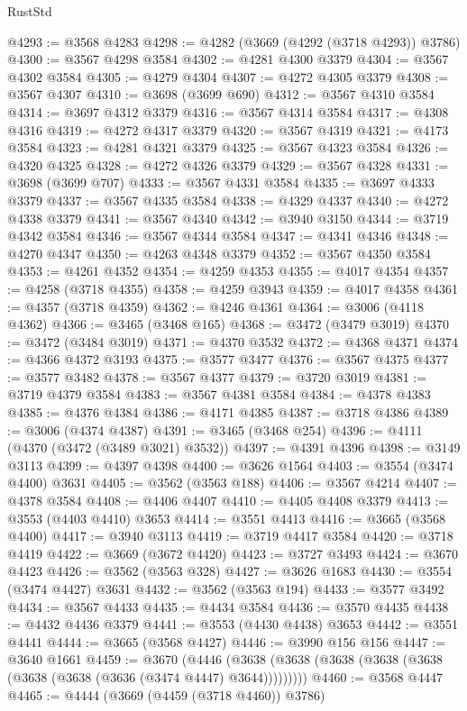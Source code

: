 \begin{lexlean}{RustStd}
\begin{coremodule}
@4293 := @3568 @4283
@4298 := @4282 (@3669 (@4292 (@3718 @4293)) @3786)
@4300 := @3567 @4298 @3584
@4302 := @4281 @4300 @3379
@4304 := @3567 @4302 @3584
@4305 := @4279 @4304
@4307 := @4272 @4305 @3379
@4308 := @3567 @4307
@4310 := @3698 (@3699 @690)
@4312 := @3567 @4310 @3584
@4314 := @3697 @4312 @3379
@4316 := @3567 @4314 @3584
@4317 := @4308 @4316
@4319 := @4272 @4317 @3379
@4320 := @3567 @4319
@4321 := @4173 @3584
@4323 := @4281 @4321 @3379
@4325 := @3567 @4323 @3584
@4326 := @4320 @4325
@4328 := @4272 @4326 @3379
@4329 := @3567 @4328
@4331 := @3698 (@3699 @707)
@4333 := @3567 @4331 @3584
@4335 := @3697 @4333 @3379
@4337 := @3567 @4335 @3584
@4338 := @4329 @4337
@4340 := @4272 @4338 @3379
@4341 := @3567 @4340
@4342 := @3940 @3150
@4344 := @3719 @4342 @3584
@4346 := @3567 @4344 @3584
@4347 := @4341 @4346
@4348 := @4270 @4347
@4350 := @4263 @4348 @3379
@4352 := @3567 @4350 @3584
@4353 := @4261 @4352
@4354 := @4259 @4353
@4355 := @4017 @4354
@4357 := @4258 (@3718 @4355)
@4358 := @4259 @3943
@4359 := @4017 @4358
@4361 := @4357 (@3718 @4359)
@4362 := @4246 @4361
@4364 := @3006 (@4118 @4362)
@4366 := @3465 (@3468 @165)
@4368 := @3472 (@3479 @3019)
@4370 := @3472 (@3484 @3019)
@4371 := @4370 @3532
@4372 := @4368 @4371
@4374 := @4366 @4372 @3193
@4375 := @3577 @3477
@4376 := @3567 @4375
@4377 := @3577 @3482
@4378 := @3567 @4377
@4379 := @3720 @3019
@4381 := @3719 @4379 @3584
@4383 := @3567 @4381 @3584
@4384 := @4378 @4383
@4385 := @4376 @4384
@4386 := @4171 @4385
@4387 := @3718 @4386
@4389 := @3006 (@4374 @4387)
@4391 := @3465 (@3468 @254)
@4396 := @4111 (@4370 (@3472 (@3489 @3021) @3532))
@4397 := @4391 @4396
@4398 := @3149 @3113
@4399 := @4397 @4398
@4400 := @3626 @1564
@4403 := @3554 (@3474 @4400) @3631
@4405 := @3562 (@3563 @188)
@4406 := @3567 @4214
@4407 := @4378 @3584
@4408 := @4406 @4407
@4410 := @4405 @4408 @3379
@4413 := @3553 (@4403 @4410) @3653
@4414 := @3551 @4413
@4416 := @3665 (@3568 @4400)
@4417 := @3940 @3113
@4419 := @3719 @4417 @3584
@4420 := @3718 @4419
@4422 := @3669 (@3672 @4420)
@4423 := @3727 @3493
@4424 := @3670 @4423
@4426 := @3562 (@3563 @328)
@4427 := @3626 @1683
@4430 := @3554 (@3474 @4427) @3631
@4432 := @3562 (@3563 @194)
@4433 := @3577 @3492
@4434 := @3567 @4433
@4435 := @4434 @3584
@4436 := @3570 @4435
@4438 := @4432 @4436 @3379
@4441 := @3553 (@4430 @4438) @3653
@4442 := @3551 @4441
@4444 := @3665 (@3568 @4427)
@4446 := @3990 @156 @156
@4447 := @3640 @1661
@4459 := @3670
    (@4446 (@3638 (@3638 (@3638 (@3638 (@3638 (@3638 (@3638 (@3636 (@3474 @4447) @3644)))))))))
@4460 := @3568 @4447
@4465 := @4444 (@3669 (@4459 (@3718 @4460)) @3786)

\end{coremodule}
\end{lexlean}
